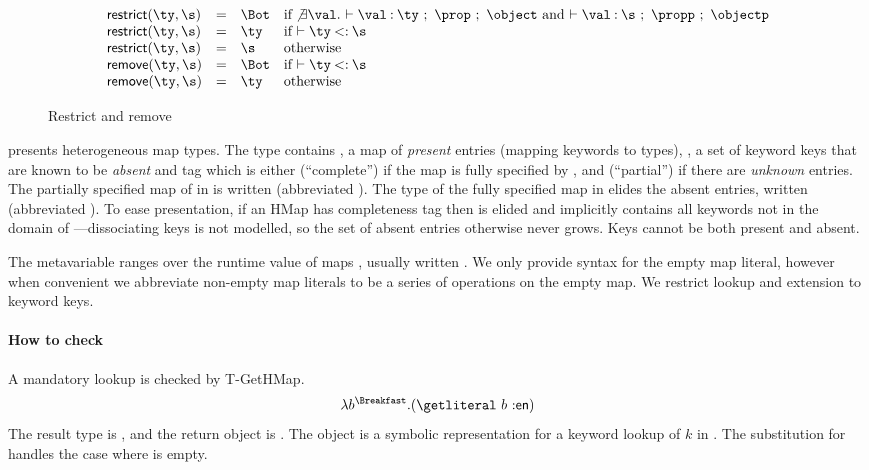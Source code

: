 \begin{figure}
$$
  \begin{array}{llll}
    \restrictfigure{}\\
    \removefigure{}
  \end{array}
$$
\caption{Restrict and remove}
\label{main:figure:restrictremove}
\end{figure}

presents
heterogeneous map types.
The type \HMapgeneric{\mandatory{}}{\absent{}}
contains {\mandatory{}}, a map of \emph{present} entries (mapping keywords to types),
\absent{}, a set of keyword keys that are known to be \emph{absent}
and
tag \completenessmeta{} which is either {\complete{}} (``complete'') if the map is fully specified by \mandatory{},
and {\partial{}} (``partial'') if there are \emph{unknown} entries.
%
The partially specified map of
 in 
is written
(abbreviated \Lunch).
%
The type of the fully specified map
 in  elides the absent entries,
written
(abbreviated \Breakfast).
To ease presentation, 
if an HMap has completeness tag \complete{} then \absent{} is elided and implicitly contains all keywords not in the domain of 
\mandatory{}---dissociating keys is not modelled, so the set of absent entries otherwise
never grows.
Keys cannot be both present and absent.

The metavariable \mapval{}
ranges over the runtime value of maps {\curlymapvaloverright{\kw{}}{\val{}}},
usually written {\curlymapvaloverrightnoarrow{\kw{}}{\val{}}}.
We %
only provide syntax for the empty map literal,
however when convenient we abbreviate non-empty map literals
to be a series of \assocliteral{} operations on the empty map.
We restrict lookup and extension to keyword keys. 

\paragraph{How to check}
A mandatory lookup is checked by T-GetHMap.
$$
\abs{\makelocal{b}}{\Breakfast}{\getexp{\makelocal{b}}{\makekw{en}}}
$$
The result type is \String, and the return object is .
The object { {\object{}} {\x{}}}
is a symbolic representation for a keyword lookup of $k$ in \object{}.
The substitution for {\x{}} handles the case where \object{} is empty.


